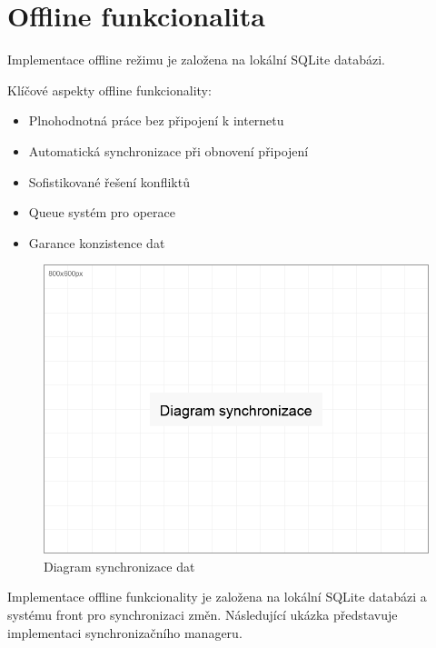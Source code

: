 \documentclass[12pt, a4paper, twoside, openright]{report}
\begin{document}
	\section{Offline funkcionalita}
	Implementace offline režimu je založena na lokální SQLite databázi.

	Klíčové aspekty offline funkcionality:
	\begin{itemize}
		\item Plnohodnotná práce bez připojení k internetu
		\item Automatická synchronizace při obnovení připojení
		\item Sofistikované řešení konfliktů
		\item Queue systém pro operace
		\item Garance konzistence dat
	\end{itemize}

	\begin{figure}[h]
		\centering
		\includegraphics[width=0.8\linewidth]{image/diagram-sync.png}
		\caption{Diagram synchronizace dat}
		\label{fig:sync}
	\end{figure}

	Implementace offline funkcionality je založena na lokální SQLite databázi a systému front pro synchronizaci změn. Následující ukázka představuje implementaci synchronizačního manageru.
\end{document}
